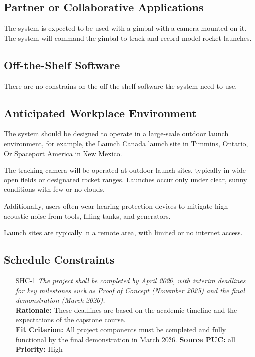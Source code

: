 \documentclass[12pt]{article}
\begin{document}
\subsection{Partner or Collaborative Applications}

The system is expected to be used with a gimbal with a camera mounted on it.
The system will command the gimbal to track and record model rocket launches.

\subsection{Off-the-Shelf Software}

There are no constrains on the off-the-shelf software the system need to use.

\subsection{Anticipated Workplace Environment}

The system should be designed to operate in a large-scale outdoor launch
environment, for example, the Launch Canada launch site in Timmins, Ontario, Or
Spaceport America in New Mexico.

The tracking camera will be operated at outdoor launch sites, typically in wide
open fields or designated rocket ranges. Launches occur only under clear, sunny
conditions with few or no clouds.

Additionally, users often wear hearing protection devices to mitigate high
acoustic noise from tools, filling tanks, and generators.

Launch sites are typically in a remote area, with limited or no internet
access.

\subsection{Schedule Constraints}

\begin{itemize}[leftmargin=*]
  \item[SHC-1] \emph{The project shall be completed by April 2026, with interim
          deadlines for key milestones such as Proof of Concept (November 2025) and the
          final demonstration (March 2026).}\\[2mm]
        \textbf{Rationale:} These deadlines are based on the academic timeline and the expectations of the capstone course.\\
        \textbf{Fit Criterion:} All project components must be completed and fully functional by the final demonstration in March 2026.
        \textbf{Source PUC:} all
        \textbf{Priority:} High
\end{itemize}
\end{document}
